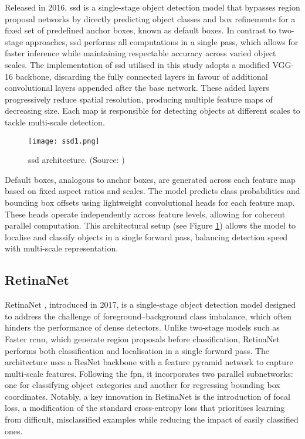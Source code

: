 Released in 2016, \gls{ssd} \cite{ssd} is a single-stage object detection model that bypasses region proposal networks by directly predicting object classes and box refinements for a fixed set of predefined anchor boxes, known as default boxes. In contrast to two-stage approaches, \gls{ssd} performs all computations in a single pass, which allows for faster inference while maintaining respectable accuracy across varied object scales.
The implementation of \gls{ssd} utilised in this study adopts a modified VGG-16 backbone, discarding the fully connected layers in favour of additional convolutional layers appended after the base network. These added layers progressively reduce spatial resolution, producing multiple feature maps of decreasing size. Each map is responsible for detecting objects at different scales to tackle multi-scale detection.

\begin{figure}[!htbp]
    \centering
    \texttt{[image: ssd1.png]}
    \caption{\gls{ssd} architecture. (Source: \cite{ssd})}
    \label{fig:ssd}
\end{figure}

Default boxes, analogous to anchor boxes, are generated across each feature map based on fixed aspect ratios and scales. The model predicts class probabilities and bounding box offsets using lightweight convolutional heads for each feature map. These heads operate independently across feature levels, allowing for coherent parallel computation. This architectural setup (see Figure \ref{fig:ssd}) allows the model to localise and classify objects in a single forward pass, balancing detection speed with multi-scale representation.

\subsection{RetinaNet}
\label{subsec:4_retinanet}

RetinaNet \cite{retinanet}, introduced in 2017, is a single-stage object detection model designed to address the challenge of foreground–background class imbalance, which often hinders the performance of dense detectors. Unlike two-stage models such as Faster \gls{rcnn}, which generate region proposals before classification, RetinaNet performs both classification and localisation in a single forward pass.
The architecture uses a ResNet backbone with a feature pyramid network to capture multi-scale features. Following the \gls{fpn}, it incorporates two parallel subnetworks: one for classifying object categories and another for regressing bounding box coordinates. Notably, a key innovation in RetinaNet is the introduction of focal loss, a modification of the standard cross-entropy loss that prioritises learning from difficult, misclassified examples while reducing the impact of easily classified ones.

